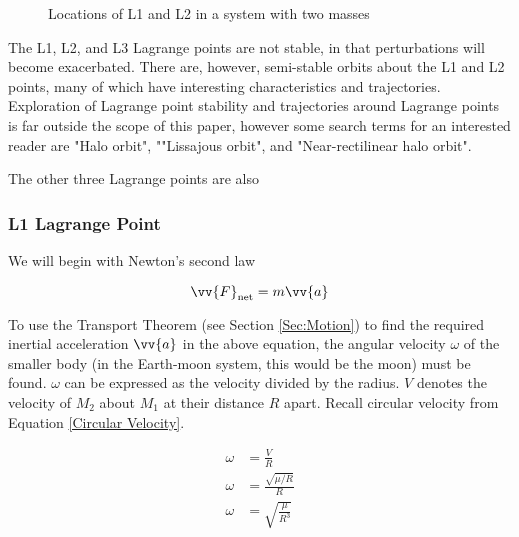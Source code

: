 \documentclass[../basicOrbitalDynamics.tex]{subfiles}
\begin{document}
\begin{figure}[H]
    \centering
    \caption{Locations of L1 and L2 in a system with two masses}\label{fig:Lagrange Points}
\end{figure}

The L1, L2, and L3 Lagrange points are not stable, in that perturbations will become exacerbated. There are, however, semi-stable orbits about the L1 and L2 points, many of which have interesting characteristics and trajectories. Exploration of Lagrange point stability and trajectories around Lagrange points is far outside the scope of this paper, however some search terms for an interested reader are "Halo orbit", ""Lissajous orbit", and "Near-rectilinear halo orbit".

The other three Lagrange points are also 

\subsubsection{L1 Lagrange Point}

We will begin with Newton's second law

$$\st{\vv{F}}{net}=m\vv{a}$$

To use the Transport Theorem (see Section \ref{Sec:Motion}) to find the required inertial acceleration $\vv{a}$ in the above equation, the angular velocity $\omega$ of the smaller body (in the Earth-moon system, this would be the moon) must be found. $\omega$ can be expressed as the velocity divided by the radius. $V$ denotes the velocity of $M_2$ about $M_1$ at their distance $R$ apart. Recall circular velocity from Equation \eqref{Circular Velocity}.

\begin{align*}
    \omega & =\frac{V}{R}  \\
    \omega & =\frac{\sqrt{\mu/R}}{R} \\
    \omega & =\sqrt{\frac{\mu}{R^3}} \\
\end{align*}
\end{document}
